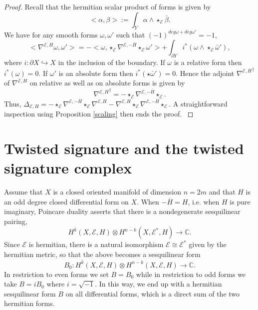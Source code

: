 \documentclass[12pt]{amsart}
\theoremstyle{plain}
\theoremstyle{definition}
\theoremstyle{remark}
\begin{document}
\begin{proof}
{{Recall that the hermitian scalar product of forms is given by 
$$
<\alpha, \beta> := \int_Y \alpha \wedge \star_{\mathcal E}\bar\beta.
$$}}
{{We have for any smooth forms $\omega, \omega'$ such that $(-1)^{deg \omega + deg \omega'} = -1$,
$$
<\nabla^{{\mathcal E}, H} \omega, \omega'> = -<\omega , \star_{\mathcal E} \nabla^{{\mathcal E}, -\overline H} \star_{\mathcal E} \omega' > + \int_{\partial Y} i^* (\omega \wedge \star_{\mathcal E} {\bar\omega'}),
$$
where $i:{{\partial X \hookrightarrow X}}$ in the inclusion of the boundary. If $\omega$ is a relative form then $i^* (\omega)=0$. If $\omega'$ is an absolute form then 
$ i^* (\star {\bar\omega'}) = 0$. Hence the adjoint ${\nabla^{{\mathcal E}, H}}^\dagger$ of $\nabla^{{\mathcal E}, H} $ on relative as well as on absolute forms is given by
$$
{\nabla^{{\mathcal E}, H} }^\dagger = - \star_{\mathcal E}\nabla^{{\mathcal E}, -\overline H} \star_{\mathcal E}.
$$
Thus, $\Delta_{{\mathcal E},H} = - \star_{\mathcal E} \nabla^{{\mathcal E}, -\overline H} \star_{\mathcal E}  \nabla^{{\mathcal E}, H} - \nabla^{{\mathcal E}, H}\star_{\mathcal E} \nabla^{{\mathcal E}, -\overline H} \star_{\mathcal E}$. A straightforward inspection using Proposition \ref{scaling} then ends the proof.
}}

\end{proof}

\section{Twisted signature and the twisted signature complex}

Assume that $X$ is a closed oriented manifold of dimension $n=2m$ and that $H$ is an odd degree closed differential form on $X$. 
When $-\overline H = H$, i.e. when $H$ is pure imaginary, Poincare duality asserts that 
there is a nondegenerate sesquilinear pairing,
\[   
H^{\bar k}(X,{\mathcal E},H) \otimes H^{\overline{n-k}}(X,{\mathcal E}^*, H) \longrightarrow {\mathbb{C}}.   
\]
Since ${\mathcal E}$ is hermitian, there is a natural isomorphism ${\mathcal E} \cong {\mathcal E}^*$ given by 
the hermitian metric, so that the above becomes a sesquilinear form
\[   
{{B_0:}} H^{\bar k}(X,{\mathcal E},H) \otimes H^{\overline{n-k}}(X,{\mathcal E}, H) \longrightarrow {\mathbb{C}}.   
\]
{{In restriction to even forms we set $B=B_0$ while in restriction to odd forms we take $B=i B_0$ where $i=\sqrt{-1}$. In this way, we end up with a hermitian 
sesquilinear form $B$ on all differential forms,
which is a direct sum of the two hermitian forms. }}
\end{document}
